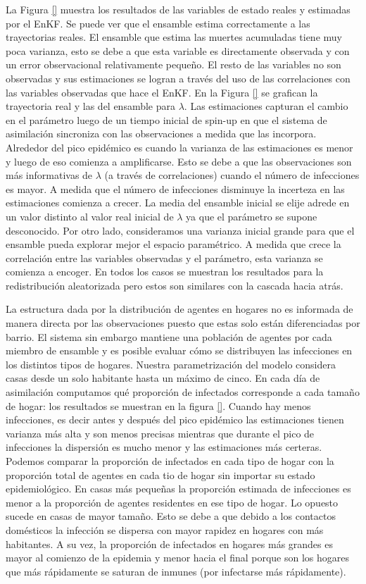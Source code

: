 La Figura \ref{} muestra los resultados de las variables de estado reales y estimadas por el EnKF. Se puede ver que el ensamble estima correctamente a las trayectorias reales. El ensamble que estima las muertes acumuladas tiene muy poca varianza, esto se debe a que esta variable es directamente observada y con un error observacional relativamente pequeño. El resto de las variables no son observadas y sus estimaciones se logran a través del uso de las correlaciones con las variables observadas que hace el EnKF. En la Figura \ref{} se grafican la trayectoria real y las del ensamble para $\lambda$. Las estimaciones capturan el cambio en el parámetro luego de un tiempo inicial de spin-up en que el sistema de asimilación sincroniza con las observaciones a medida que las incorpora. Alrededor del pico epidémico es cuando la varianza de las estimaciones es menor y luego de eso comienza a amplificarse. Esto se debe a que las observaciones son más informativas de $\lambda$ (a través de correlaciones) cuando el número de infecciones es mayor. A medida que el número de infecciones disminuye la incerteza en las estimaciones comienza a crecer. La media del ensamble inicial se elije adrede en un valor distinto al valor real inicial de $\lambda$ ya que el parámetro se supone desconocido. Por otro lado, consideramos una varianza inicial grande para que el ensamble pueda explorar mejor el espacio paramétrico. A medida que crece la correlación entre las variables observadas y el parámetro, esta varianza se comienza a encoger. En todos los casos se muestran los resultados para la redistribución aleatorizada pero estos son similares con la cascada hacia atrás.

La estructura dada por la distribución de agentes en hogares no es informada de manera directa por las observaciones puesto que estas solo están diferenciadas por barrio. El sistema sin embargo mantiene una población de agentes por cada miembro de ensamble y es posible evaluar cómo se distribuyen las infecciones en los distintos tipos de hogares. Nuestra parametrización del modelo considera casas desde un solo habitante hasta un máximo de cinco. En cada día de asimilación computamos qué proporción de infectados corresponde a cada tamaño de hogar: los resultados se muestran en la figura \ref{}. Cuando hay menos infecciones, es decir antes y después del pico epidémico las estimaciones tienen varianza más alta y son menos precisas mientras que durante el pico de infecciones la dispersión es mucho menor y las estimaciones más certeras. Podemos comparar la proporción de infectados en cada tipo de hogar con la proporción total de agentes en cada tio de hogar sin importar su estado epidemiológico. En casas más pequeñas la proporción estimada de infecciones es menor a la proporción de agentes residentes en ese tipo de hogar. Lo opuesto sucede en casas de mayor tamaño. Esto se debe a que debido a los contactos domésticos la infección se dispersa con mayor rapidez en hogares con más habitantes. A su vez, la proporción de infectados en hogares más grandes es mayor al comienzo de la epidemia y menor hacia el final porque son los hogares que más rápidamente se saturan de inmunes (por infectarse más rápidamente). 

